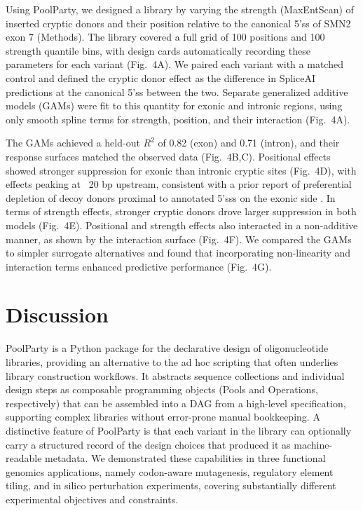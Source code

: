 \documentclass[unnumsec,webpdf,modern,large]{mam-authoring-template}%
\theoremstyle{thmstyleone}%
\theoremstyle{thmstyletwo}%
\theoremstyle{thmstylethree}%
\begin{document}
Using PoolParty, we designed a library by varying the strength (MaxEntScan) of inserted cryptic donors and their position relative to the canonical 5'ss of SMN2 exon 7 (Methods). The library covered a full grid of 100 positions and 100 strength quantile bins, with design cards automatically recording these parameters for each variant (Fig.~4A). We paired each variant with a matched control and defined the cryptic donor effect as the difference in SpliceAI predictions at the canonical 5'ss between the two. Separate generalized additive models (GAMs) were fit to this quantity for exonic and intronic regions, using only smooth spline terms for strength, position, and their interaction (Fig.~4A).

The GAMs achieved a held-out $R^2$ of 0.82 (exon) and 0.71 (intron), and their response surfaces matched the observed data (Fig.~4B,C). Positional effects showed stronger suppression for exonic than intronic cryptic sites (Fig.~4D), with effects peaking at ~20 bp upstream, consistent with a prior report of preferential depletion of decoy donors proximal to annotated 5'sss on the exonic side \citep{Dawes2022empirical}. In terms of strength effects, stronger cryptic donors drove larger suppression in both models (Fig.~4E). Positional and strength effects also interacted in a non-additive manner, as shown by the interaction surface (Fig.~4F). We compared the GAMs to simpler surrogate alternatives and found that incorporating non-linearity and interaction terms enhanced predictive performance (Fig.~4G).


\section{Discussion}

PoolParty is a Python package for the declarative design of oligonucleotide libraries, providing an alternative to the ad hoc scripting that often underlies library construction workflows. It abstracts sequence collections and individual design steps as composable programming objects (Pools and Operations, respectively) that can be assembled into a DAG from a high-level specification, supporting complex libraries without error-prone manual bookkeeping. A distinctive feature of PoolParty is that each variant in the library can optionally carry a structured record of the design choices that produced it as machine-readable metadata. We demonstrated these capabilities in three functional genomics applications, namely codon-aware mutagenesis, regulatory element tiling, and in silico perturbation experiments, covering substantially different experimental objectives and constraints.
\end{document}
